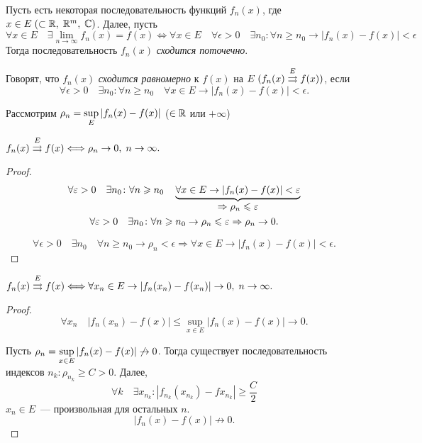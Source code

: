 \setcounter{section}{15}

\begin{definition}
Пусть есть некоторая последовательность функций \(f_n(x)\), где \(x \hm\in E \; (\subset \R, \;
\R^m, \; \Cm)\). Далее, пусть
\[
    \forall x \in E \quad \exists \lim_{n \rightarrow \infty} f_n(x) = f(x) \Longleftrightarrow
        \forall x \in E \quad \forall \epsilon > 0 \quad \exists n_0 \colon \forall n \geq n_0
        \rightarrow |f_n(x) - f(x)| < \epsilon
\]
Тогда последовательность \(f_n(x)\) \textit{сходится поточечно}.
\end{definition}

\begin{definition}
Говорят, что \(f_n(x)\) \textit{сходится равномерно} к \(f(x)\) на \(E \; (f_n(x) \hm{\rra E}
f(x))\), если
\[
    \forall \epsilon > 0 \quad \exists n_0 \colon \forall n \geq n_0 \quad \forall x \in E
        \rightarrow |f_n(x) - f(x)| < \epsilon.
\]
\end{definition}

Рассмотрим \(\displaystyle \rho_n = \sup_E |f_n(x) - f(x)|\) (\(\in \mathbb{R}\) или \(+\infty\))

\begin{statement}
\(f_n(x) \overset{E}{\rightrightarrows} f(x) \Longleftrightarrow \rho_n \rightarrow 0, \; n \rightarrow \infty.\)
\end{statement}

\begin{proof}
\Boxedrightarrow
\begin{gather}
    \forall \varepsilon > 0 \quad \exists n_0 \colon \forall n \geqslant n_0 \quad \underbrace{\forall x \in
        E \rightarrow |f_n(x) - f(x)| < \varepsilon}_{\displaystyle \Rightarrow \rho_n \leqslant \varepsilon}\\
    \forall \varepsilon > 0 \quad \exists n_0 \colon \forall n \geqslant n_0 \rightarrow \rho_n \leqslant \varepsilon
        \Rightarrow \rho_n \rightarrow 0.
\end{gather}

\Boxedleftarrow
\[
    \forall \epsilon > 0 \quad \exists n_0 \quad \forall n \geq n_0 \rightarrow \rho_n < \epsilon
        \Rightarrow \forall x \in E \rightarrow |f_n(x) - f(x)| < \epsilon.
\]
\end{proof}

\begin{statement}
\(f_n(x) \overset{E}{\rightrightarrows} f(x) \Longleftrightarrow \forall x_n \in E \rightarrow |f_n(x_n) - f(x_n)|
\rightarrow 0, \; n \rightarrow \infty.\)
\end{statement}

\begin{proof}
\Boxedrightarrow
\[
    \forall x_n \quad |f_n(x_n) - f(x)| \leq \sup_{x \in E} |f_n(x) - f(x)| \rightarrow 0.
\]

\Boxedleftarrow Пусть \(\displaystyle \rho_n = \sup_{x \in E} |f_n(x) - f(x)| \not\rightarrow 0\). Тогда 
существует последовательность индексов \(n_k \colon \rho_{n_k} \geq C > 0\). Далее,
\[
    \forall k \quad \exists x_{n_k} \colon |f_{n_k}(x_{n_k}) - f{x_{n_k}}| \geq \frac{C}{2}
\]
\(x_n \in E\)~--- произвольная для остальных \(n\).
\[
    |f_n(x) - f(x)| \not\rightarrow 0.
\]
\end{proof}